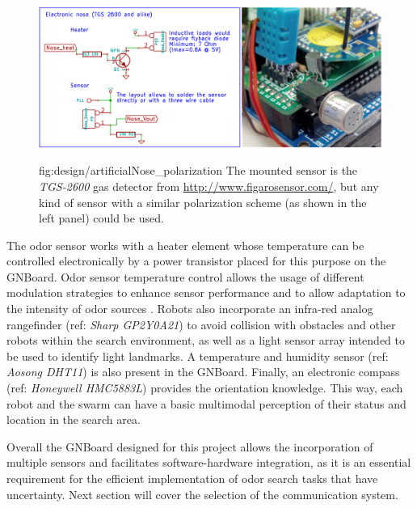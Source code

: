 \begin{figure}[h!]
\centerline{\mbox{\includegraphics[width=14cm]{images/design/artificialNose_polarization.eps}}}
{fig:design/artificialNose_polarization}{
The mounted sensor is the \emph{TGS-2600} gas detector from \url{http://www.figarosensor.com/}, but any kind of sensor with a similar polarization scheme (as shown in the left panel) could be used.
}\end{figure}

The odor sensor works with a heater element whose temperature can be controlled electronically by a power transistor placed for this purpose on the GNBoard.
Odor sensor temperature control allows the usage of different modulation strategies to enhance sensor performance and to allow adaptation to the intensity of odor sources \cite{YanezToledano12}. 
Robots also incorporate an infra-red analog rangefinder (ref: \emph{Sharp GP2Y0A21}) to avoid collision with obstacles and other robots within the search environment, as well as a light sensor array intended to be used to identify light landmarks.
A temperature and humidity sensor (ref: \emph{Aosong DHT11}) is also present in the GNBoard.
Finally, an electronic compass (ref: \emph{Honeywell HMC5883L}) provides the orientation knowledge.
This way, each robot and the swarm can have a basic multimodal perception of their status and location in the search area.

Overall the GNBoard designed for this project allows the incorporation of multiple sensors and facilitates software-hardware integration, as it is an essential requirement for the efficient implementation of odor search tasks that have uncertainty. Next section will cover the selection of the communication system.


\vspace{-0.5cm}


